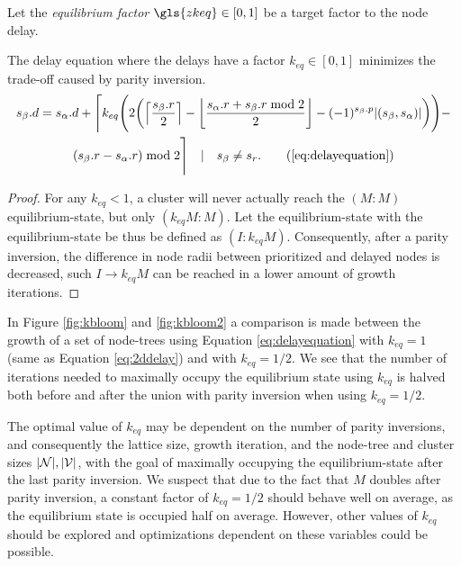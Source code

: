 \begin{definition}
  Let the \emph{equilibrium factor} $\gls{zkeq}\in [0,1]$ be a target factor to the node delay. 
\end{definition}
\begin{lemma}
  The delay equation where the delays have a factor $k_{eq}\in [0,1]$ minimizes the trade-off caused by parity inversion. 
  \begin{multline}
    s_\beta.d = s_\alpha.d + \Bigg \lceil k_{eq} \Bigg( 2\bigg(\ceil{\frac{s_\beta.r}{2}} - \floor{\frac{s_\alpha.r + s_\beta.r \bmod 2}{2}} - (-1)^{s_\beta.p}\abs{(s_\beta,s_\alpha)}\bigg)
    \Bigg) - \\
    (s_\beta.r - s_\alpha.r) \bmod 2 \Bigg \rceil \hspace{1em} | \hspace{1em} s_\beta \neq s_r. \tag{\ref{eq:delayequation}}
  \end{multline}
\end{lemma}
\begin{proof}
  For any $k_{eq} < 1$, a cluster will never actually reach the $(M:M)$ equilibrium-state, but only $(k_{eq}M:M)$. Let the equilibrium-state with the equilibrium-state be thus be defined as $(I:k_{eq}M)$. Consequently, after a parity inversion, the difference in node radii between prioritized and delayed nodes is decreased, such $I\to k_{eq}M$ can be reached in a lower amount of growth iterations. 
\end{proof}

In Figure \ref{fig:kbloom} and \ref{fig:kbloom2} a comparison is made between the growth of a set of node-trees using Equation \eqref{eq:delayequation} with $k_{eq}=1$ (same as Equation \eqref{eq:2ddelay}) and with $k_{eq}=1/2$. We see that the number of iterations needed to maximally occupy the equilibrium state using $k_{eq}$ is halved both before and after the union with parity inversion when using $k_{eq} = 1/2$. 

The optimal value of $k_{eq}$ may be dependent on the number of parity inversions, and consequently the lattice size, growth iteration, and the node-tree and cluster sizes $|\mathcal{N}|, |\mathcal{V}|$, with the goal of maximally occupying the equilibrium-state after the last parity inversion. We suspect that due to the fact that $M$ doubles after parity inversion, a constant factor of $k_{eq}=1/2$ should behave well on average, as the equilibrium state is occupied half on average. However, other values of $k_{eq}$ should be explored and optimizations dependent on these variables could be possible. 

